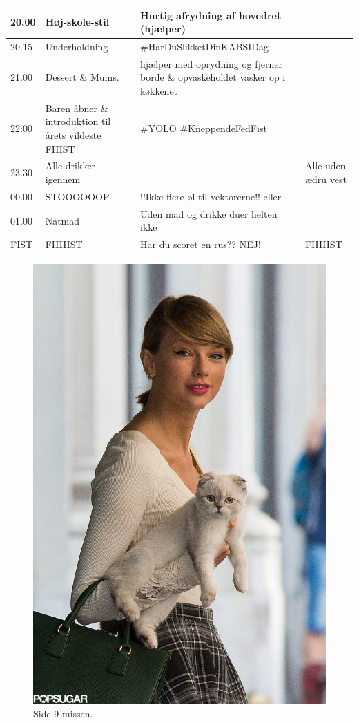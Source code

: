 \begin{tabular}{ | p{1cm} | p{4cm} | p{5.5cm} | p{4cm} | }
	20.00 & Høj-skole-stil & Hurtig afrydning af hovedret (\Norder hjælper) & \Hyttebombz{} \YOLO \\ \hline
	20.15 & Underholdning & \#HarDuSlikketDinKABSIDag & \Alle \\ \hline
	21.00 & Dessert \& Mums. & \Norder hjælper med oprydning og fjerner borde \& opvaskeholdet vasker op i køkkenet & \Hyttebombz{} \YOLO \\ \hline
	22:00 & Baren åbner \& introduktion til årets vildeste FIIIST & \#YOLO \#KneppendeFedFist & \Alle \Gabriel \\ \hline
	23.30 & Alle drikker igennem &  & Alle uden ædru vest \\ \hline
	00.00 & STOOOOOOP & !!Ikke flere øl til vektorerne!! eller \KABS & \Alle \\ \hline
	01.00 & Natmad & Uden mad og drikke duer helten ikke & \Hyttebombz{} \\ \hline
	FIST & FIIIIIST & Har du scoret en rus?? NEJ! & FIIIIIST \\ \hline
\end{tabular}

\clearpage
\begin{figure}[H]
    \centering
    \includegraphics[width=0.8\linewidth]{diverse/side9.jpg}
    \caption{Side 9 missen.}
\end{figure}

